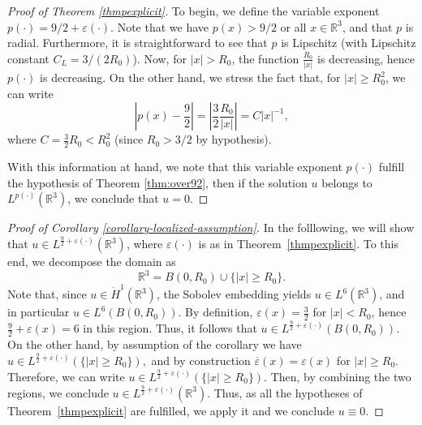 \documentclass[a4paper,12pt]{amsart}
\theoremstyle{definition}
\theoremstyle{plain}
\def\R{\mathbb{R}}
\def\R{\mathbb R}
\begin{document}

\begin{proof}[Proof of Theorem \ref{thmpexplicit}]

To begin, we define the variable exponent $p(\cdot)= {9} / {2} + \varepsilon(\cdot)$. 
Note  that we have $p(x)> {9} / {2}$ or all $x\in \R^3$,  and that $p$ is radial. Furthermore, it is straightforward to see that $p$ is Lipschitz (with Lipschitz constant $C_L = 3 / (2R_0) $).
 Now,  for $ |x| > R_0 $, the function $ \frac{R_0}{|x|} $ is  decreasing, hence $ p(\cdot) $ is  decreasing. On the other hand, we stress the fact that, for $ |x| \geq R_0^2 $, we can write 
\[
\left| p(x) - \frac{9}{2} \right| =
 \left| \frac{3}{2} \frac{R_0}{|x|} \right| = C |x|^{-1},
\]
where $ C = \frac{3}{2} R_0 <R_0^2$ (since $R_0>3/2$ by hypothesis).

With this information at hand, we note that this variable exponent $p(\cdot)$ fulfill the hypothesis of Theorem \ref{thm:over92}, then if the solution $u$ belongs to $L^{p(\cdot)} (\R^3)$, we conclude that $u=0$.
\end{proof}


 
 \begin{proof}[Proof of Corollary \ref{corollary-localized-assumption}]
In the folllowing, we will show that $
u \in L^{\frac{9}{2}+\varepsilon(\cdot)}(\mathbb{R}^3)$, 
where \( \varepsilon(\cdot) \) is as in Theorem~\ref{thmpexplicit}.
To this end, we decompose the domain as
\[
\mathbb{R}^3 = B(0,R_0) \cup \{ |x| \geq R_0 \}.
\]
Note that, since \( u \in \dot{H}^1(\mathbb{R}^3) \), the Sobolev embedding yields \( u \in L^6(\mathbb{R}^3) \), and in particular \( u \in L^6(B(0,R_0)) \).  
By definition, \( \varepsilon(x) = \frac{3}{2} \) for \( |x| < R_0 \), hence \( \frac{9}{2} + \varepsilon(x) = 6 \) in this region. 
Thus, it follows that $u \in L^{\frac{9}{2}+\varepsilon(\cdot)}(B(0,R_0)).$
On the other hand, by assumption of the corollary we have
$ u \in L^{\frac{9}{2}+\overline{\varepsilon}(\cdot)}(\{ |x| \geq R_0 \}),$
and by construction \( \overline{\varepsilon}(x) = \varepsilon(x) \) for \( |x| \geq R_0 \). Therefore, we can write $
u \in L^{\frac{9}{2}+\varepsilon(\cdot)}(\{ |x| \geq R_0 \}).
$
Then, by combining the two regions, we conclude 
$
u \in L^{\frac{9}{2}+\varepsilon(\cdot)}(\mathbb{R}^3).
$
Thus, as all the hypotheses of Theorem~\ref{thmpexplicit} are fulfilled, we apply it and we conclude \( u \equiv 0 \).
\end{proof}
 
\end{document}
